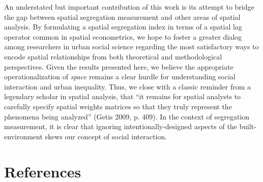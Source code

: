 \documentclass[
  10pt,
]{article}
\begin{document}
An understated but important contribution of this work is its attempt to
bridge the gap between spatial segregation measurement and other areas
of spatial analysis. By formulating a spatial segregation index in terms
of a spatial lag operator common in spatial econometrics, we hope to
foster a greater dialog among researchers in urban social science
regarding the most satisfactory ways to encode spatial relationships
from both theoretical and methodological perspectives. Given the results
presented here, we believe the appropriate operationalization of
\emph{space} remains a clear hurdle for understanding social interaction
and urban inequality. Thus, we close with a classic reminder from a
legendary scholar in spatial analysis, that ``it remains for spatial
analysts to carefully specify spatial weights matrices so that they
truly represent the phenomena being analyzed'' (Getis 2009, p. 409). In
the context of segregation measurement, it is clear that ignoring
intentionally-designed aspects of the built-environment skews our
concept of social interaction.

\hypertarget{references}{%
\section{References}\label{references}}

\end{document}
